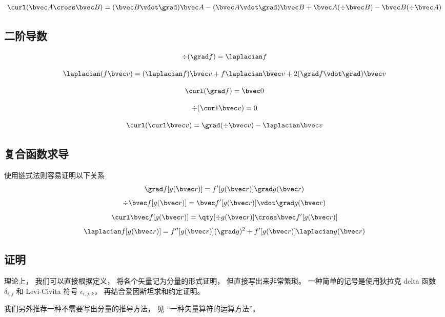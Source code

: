 \begin{equation}\label{eq_VopEq_6}
\curl (\bvec A \cross \bvec B) = (\bvec B \vdot \grad) \bvec A - (\bvec A \vdot \grad) \bvec B + \bvec A (\div \bvec B) - \bvec B (\div \bvec A)
\end{equation}

\subsection{二阶导数}

\begin{equation}
\div (\grad f) = \laplacian f
\end{equation}

\begin{equation}\label{eq_VopEq_5}
\laplacian (f \bvec v) = (\laplacian f)\bvec v + f \laplacian \bvec v + 2 (\grad f \vdot \grad) \bvec v
\end{equation}

\begin{equation}
\curl (\grad f) = \bvec 0
\end{equation}

\begin{equation}
\div (\curl \bvec v) = 0
\end{equation}

\begin{equation}\label{eq_VopEq_7}
\curl(\curl \bvec v) = \grad(\div\bvec v) - \laplacian \bvec v
\end{equation}

\subsection{复合函数求导}
使用链式法则容易证明以下关系
\begin{equation}
\grad f[g(\bvec r)] = f'[g(\bvec r)] \grad g(\bvec r)
\end{equation}
\begin{equation}
\div \bvec f[g(\bvec r)] = \bvec f'[g(\bvec r)] \vdot \grad g(\bvec r)
\end{equation}
\begin{equation}
\curl \bvec f[g(\bvec r)] = \qty[\div g(\bvec r)] \cross \bvec f'[g(\bvec r)]
\end{equation}
\begin{equation}
\laplacian f[g(\bvec r)] = f''[g(\bvec r)] (\grad g)^2 + f'[g(\bvec r)] \laplacian g(\bvec r)
\end{equation}

\subsection{证明}
理论上， 我们可以直接根据定义， 将各个矢量记为分量的形式证明， 但直接写出来非常繁琐。 一种简单的记号是使用狄拉克 delta 函数 $\delta_{i,j}$ 和 Levi-Civita 符号 $\epsilon_{i,j,k}$， 再结合爱因斯坦求和约定证明。

我们另外推荐一种不需要写出分量的推导方法， 见 “一种矢量算符的运算方法”。
